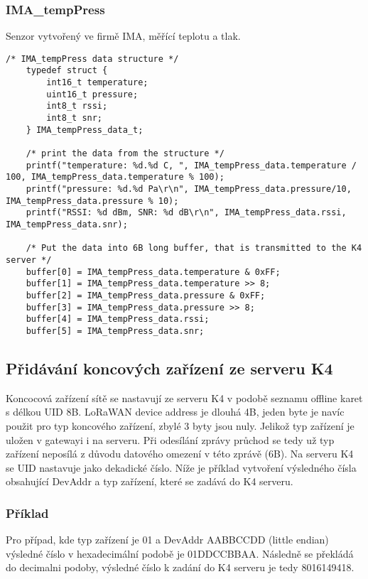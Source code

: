 \subsubsection{IMA\_tempPress}
Senzor vytvořený ve firmě IMA, měřící teplotu a tlak.

\begin{lstlisting}[style=CStyle]
    /* IMA_tempPress data structure */   
    typedef struct {
        int16_t temperature;
        uint16_t pressure;
        int8_t rssi;
        int8_t snr;
    } IMA_tempPress_data_t;
    
    /* print the data from the structure */
	printf("temperature: %d.%d C, ", IMA_tempPress_data.temperature / 100, IMA_tempPress_data.temperature % 100);
	printf("pressure: %d.%d Pa\r\n", IMA_tempPress_data.pressure/10, IMA_tempPress_data.pressure % 10);
	printf("RSSI: %d dBm, SNR: %d dB\r\n", IMA_tempPress_data.rssi, IMA_tempPress_data.snr);

    /* Put the data into 6B long buffer, that is transmitted to the K4 server */
	buffer[0] = IMA_tempPress_data.temperature & 0xFF;
	buffer[1] = IMA_tempPress_data.temperature >> 8;
	buffer[2] = IMA_tempPress_data.pressure & 0xFF;
	buffer[3] = IMA_tempPress_data.pressure >> 8;
	buffer[4] = IMA_tempPress_data.rssi;
	buffer[5] = IMA_tempPress_data.snr;
\end{lstlisting}


\subsection{Přidávání koncových zařízení ze serveru K4}
Koncocová zařízení sítě se nastavují ze serveru K4 v podobě seznamu offline karet s délkou UID 8B.
LoRaWAN device address je dlouhá 4B, jeden byte je navíc použit pro typ koncového zařízení, zbylé 3 byty jsou nuly.
Jelikož typ zařízení je uložen v gatewayi i na serveru. Při odesílání zprávy průchod se tedy už typ zařízení neposílá z důvodu datového omezení v této zprávě (6B).
Na serveru K4 se UID nastavuje jako dekadické číslo.
Níže je příklad vytvoření výsledného čísla obsahující DevAddr a typ zařízení, které se zadává do K4 serveru.

\subsubsection{Příklad}
Pro případ, kde typ zařízení je 01 a DevAddr AABBCCDD (little endian) výsledné číslo v hexadecimální podobě je 01DDCCBBAA. Následně se překládá do decimalni podoby, výsledné číslo k zadání do K4 serveru je tedy 8016149418.


